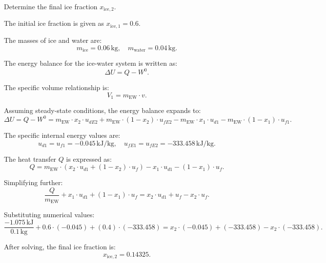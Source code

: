 Determine the final ice fraction \( x_{\text{ice},2} \).

The initial ice fraction is given as \( x_{\text{ice},1} = 0.6 \).  

The masses of ice and water are:  
\[
m_{\text{ice}} = 0.06 \, \text{kg}, \quad m_{\text{water}} = 0.04 \, \text{kg}.
\]

The energy balance for the ice-water system is written as:  
\[
\Delta U = Q - W^0.
\]

The specific volume relationship is:  
\[
V_1 = m_{\text{EW}} \cdot v.
\]

Assuming steady-state conditions, the energy balance expands to:  
\[
\Delta U = Q - W^0 = m_{\text{EW}} \cdot x_2 \cdot u_{dE2} + m_{\text{EW}} \cdot (1 - x_2) \cdot u_{fE2} - m_{\text{EW}} \cdot x_1 \cdot u_{d1} - m_{\text{EW}} \cdot (1 - x_1) \cdot u_{f1}.
\]

The specific internal energy values are:  
\[
u_{d1} = u_{f1} = -0.045 \, \text{kJ/kg}, \quad u_{fE1} = u_{fE2} = -333.458 \, \text{kJ/kg}.
\]

The heat transfer \( Q \) is expressed as:  
\[
Q = m_{\text{EW}} \cdot \left( x_2 \cdot u_{d1} + (1 - x_2) \cdot u_f \right) - x_1 \cdot u_{d1} - (1 - x_1) \cdot u_f.
\]

Simplifying further:  
\[
\frac{Q}{m_{\text{EW}}} + x_1 \cdot u_{d1} + (1 - x_1) \cdot u_f = x_2 \cdot u_{d1} + u_f - x_2 \cdot u_f.
\]

Substituting numerical values:  
\[
\frac{-1.075 \, \text{kJ}}{0.1 \, \text{kg}} + 0.6 \cdot (-0.045) + (0.4) \cdot (-333.458) = x_2 \cdot (-0.045) + (-333.458) - x_2 \cdot (-333.458).
\]

After solving, the final ice fraction is:  
\[
x_{\text{ice},2} = 0.14325.
\]